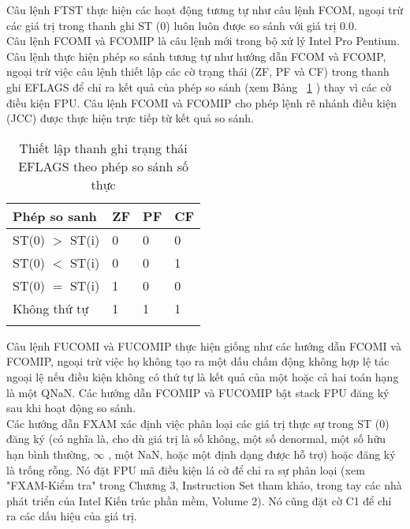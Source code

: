 		Câu lệnh FTST thực hiện các hoạt động tương tự như câu lệnh FCOM, ngoại trừ các giá trị trong thanh ghi ST (0) luôn luôn được so sánh với giá trị 0.0.\\
		
		Câu lệnh FCOMI và FCOMIP là câu lệnh mới trong bộ xử lý Intel Pro Pentium. Câu lệnh thực hiện phép so sánh tương tự như hướng dẫn FCOM và FCOMP, ngoại trừ việc câu lệnh thiết lập các cờ trạng thái (ZF, PF và CF) trong thanh ghi EFLAGS để chỉ ra kết quả của phép so sánh (xem Bảng ~\ref{tb:EFLAGS} ) thay vì các cờ điều kiện FPU. Câu lệnh FCOMI và FCOMIP cho phép lệnh rẽ nhánh điều kiện (JCC) được thực hiện trực tiếp từ kết quả so sánh.
		\begin{longtable}{|l|l|l|l|}
			\hline
				Phép so sanh & ZF & PF & CF \\
			\hline
			\hline
					ST(0) $>$ ST(i) & 0 & 0 & 0 \\	
			\hline
					ST(0) $<$ ST(i) & 0 & 0 & 1 \\	
			\hline
					ST(0) $=$ ST(i) & 1 & 0 & 0 \\	
			\hline
					Không thứ tự & 1 & 1 & 1 \\	
			\hline
				\caption{Thiết lập thanh ghi trạng thái EFLAGS theo phép so sánh số thực}
				\label{tb:EFLAGS}
		\end{longtable}	
		
		Câu lệnh FUCOMI và FUCOMIP thực hiện giống như các hướng dẫn FCOMI và FCOMIP, ngoại trừ việc họ không tạo ra một dấu chấm động không hợp lệ tác ngoại lệ nếu điều kiện không có thứ tự là kết quả của một hoặc cả hai toán hạng là một QNaN. Các hướng dẫn FCOMIP và FUCOMIP bật stack FPU đăng ký sau khi hoạt động so sánh.\\
		
		Các hướng dẫn FXAM xác định việc phân loại các giá trị thực sự trong ST (0) đăng ký (có nghĩa là, cho dù giá trị là số không, một số denormal, một số hữu hạn bình thường, $\mathbb{\infty}$ , một NaN, hoặc một định dạng được hỗ trợ) hoặc đăng ký là trống rỗng. Nó đặt FPU mã điều kiện lá cờ để chỉ ra sự phân loại (xem "FXAM-Kiểm tra" trong Chương 3, Instruction Set tham khảo, trong tay các nhà phát triển của Intel Kiến trúc phần mềm, Volume 2). Nó cũng đặt cờ C1 để chỉ ra các dấu hiệu của giá trị.
		
